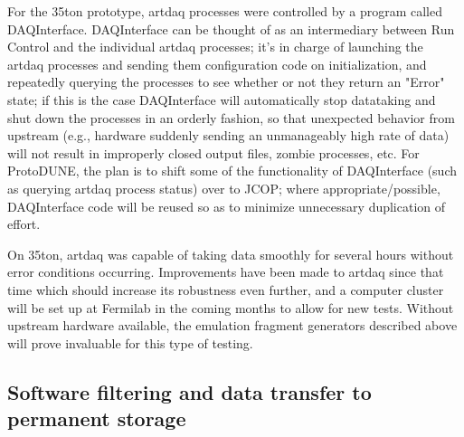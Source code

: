For the 35ton prototype, artdaq processes were controlled by a program called
DAQInterface. DAQInterface can be thought of as an intermediary
between Run Control and the individual artdaq processes; it's in
charge of launching the artdaq processes and sending them
configuration code on initialization, and repeatedly querying the
processes to see whether or not they return an "Error" state; if this
is the case DAQInterface will automatically stop datataking and shut
down the processes in an orderly fashion, so that unexpected behavior
from upstream (e.g., hardware suddenly sending an unmanageably high
rate of data) will not result in improperly closed output files,
zombie processes, etc. For ProtoDUNE, the plan is to shift some of the functionality of DAQInterface (such as querying artdaq process status) over to JCOP; where appropriate/possible, DAQInterface code will be reused so as to minimize unnecessary duplication of effort. 

On 35ton, artdaq was capable of taking data smoothly for several hours
without error conditions occurring. Improvements have been made to
artdaq since that time which should increase its robustness even
further, and a computer cluster will be set up at Fermilab in the
coming months to allow for new tests. Without upstream hardware
available, the emulation fragment generators described above will
prove invaluable for this type of testing.




\subsection{Software filtering and data transfer to permanent storage}




